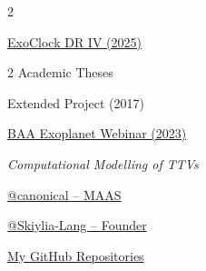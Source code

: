 \setcolumnwidth{0.18\paperwidth, 0.78\paperwidth}
\setlength{\columnsep}{0.02\paperwidth}
\begin{paracol}{2}

\thinfont\color{grey}
\raggedleft



{\small{}\hspace{1mm}\href{https://arxiv.org/abs/2511.14407}{ExoClock DR IV (2025)}}\par
{\small{}\hspace{1mm}2 Academic Theses}\par
\ifshowextra
{\small{}\hspace{1mm}Extended Project (2017)}\par
\fi

\ifshowextra
{}
{\small{}\hspace{1mm}\href{https://britastro.org/event/exoplanet-2023sep}{BAA Exoplanet Webinar (2023)}}\par
{\small{}\hspace{1mm}\textit{Computational Modelling of TTVs}}\par
\fi

{\small{}\hspace{1mm}\href{https://github.com/canonical/maas}{@canonical -- MAAS}}\par
{\small{}\hspace{1mm}\href{https://github.com/Skiylia-Lang}{@Skiylia-Lang -- Founder}}\par
{\small{}\hspace{1mm}\href{https://github.com/skyecas}{My GitHub Repositories}}\par

\showsidebarhobbies{}
\newpage{}

\switchcolumn


\end{paracol}
